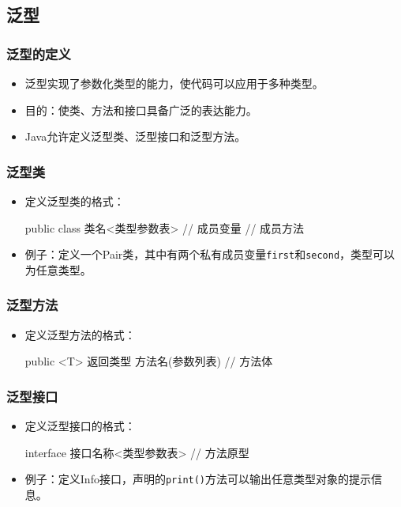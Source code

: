 \documentclass[a4paper, 10pt]{ctexart}
\begin{document}
\subsection{泛型}
\subsubsection{泛型的定义}
\begin{itemize}
  \item 泛型实现了参数化类型的能力，使代码可以应用于多种类型。
  \item 目的：使类、方法和接口具备广泛的表达能力。
  \item Java允许定义泛型类、泛型接口和泛型方法。
\end{itemize}

\subsubsection{泛型类}
\begin{itemize}
  \item 定义泛型类的格式：
  \begin{codeblock}
public class 类名<类型参数表> {
    // 成员变量
    // 成员方法
}
  \end{codeblock}
  \item 例子：定义一个Pair类，其中有两个私有成员变量\texttt{first}和\texttt{second}，类型可以为任意类型。
\end{itemize}

\subsubsection{泛型方法}
\begin{itemize}
  \item 定义泛型方法的格式：
  \begin{codeblock}
public <T> 返回类型 方法名(参数列表) {
    // 方法体
}
  \end{codeblock}
\end{itemize}

\subsubsection{泛型接口}
\begin{itemize}
  \item 定义泛型接口的格式：
  \begin{codeblock}
interface 接口名称<类型参数表> {
    // 方法原型
}
  \end{codeblock}
  \item 例子：定义Info接口，声明的\texttt{print()}方法可以输出任意类型对象的提示信息。
\end{itemize}
\end{document}
